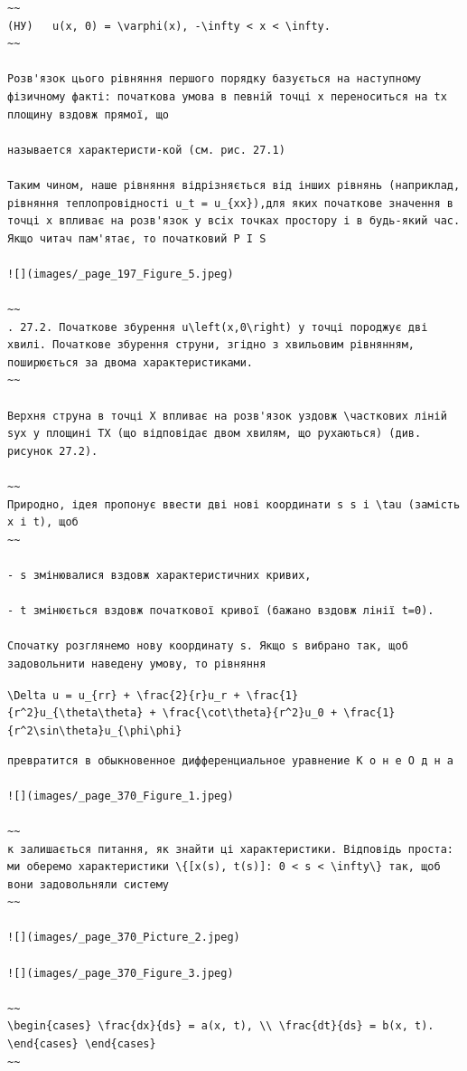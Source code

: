 \documentclass[
  ukrainian,
]{article}
\begin{document}
\begin{verbatim}
~~
(НУ)   u(x, 0) = \varphi(x), -\infty < x < \infty.
~~

Розв'язок цього рівняння першого порядку базується на наступному фізичному факті: початкова умова в певній точці x переноситься на tx площину вздовж прямої, що

называется характеристи-кой (см. рис. 27.1)

Таким чином, наше рівняння відрізняється від інших рівнянь (наприклад, рівняння теплопровідності u_t = u_{xx}),для яких початкове значення в точці x впливає на розв'язок у всіх точках простору і в будь-який час. Якщо читач пам'ятає, то початковий P I S

![](images/_page_197_Figure_5.jpeg)

~~
. 27.2. Початкове збурення u\left(x,0\right) у точці породжує дві хвилі. Початкове збурення струни, згідно з хвильовим рівнянням, поширюється за двома характеристиками.
~~

Верхня струна в точці X впливає на розв'язок уздовж \часткових ліній syx у площині TX (що відповідає двом хвилям, що рухаються) (див. рисунок 27.2).

~~
Природно, ідея пропонує ввести дві нові координати s s і \tau (замість x і t), щоб
~~

- s змінювалися вздовж характеристичних кривих,

- t змінюється вздовж початкової кривої (бажано вздовж лінії t=0).

Спочатку розглянемо нову координату s. Якщо s вибрано так, щоб задовольнити наведену умову, то рівняння
\end{verbatim}

\texttt{\textbackslash{}Delta\ u\ =\ u\_\{rr\}\ +\ \textbackslash{}frac\{2\}\{r\}u\_r\ +\ \textbackslash{}frac\{1\}\{r\^{}2\}u\_\{\textbackslash{}theta\textbackslash{}theta\}\ +\ \textbackslash{}frac\{\textbackslash{}cot\textbackslash{}theta\}\{r\^{}2\}u\_0\ +\ \textbackslash{}frac\{1\}\{r\^{}2\textbackslash{}sin\textbackslash{}theta\}u\_\{\textbackslash{}phi\textbackslash{}phi\}}

\begin{verbatim}
превратится в обыкновенное дифференциальное уравнение К о н е О д н а

![](images/_page_370_Figure_1.jpeg)

~~
к залишається питання, як знайти ці характеристики. Відповідь проста: ми оберемо характеристики \{[x(s), t(s)]: 0 < s < \infty\} так, щоб вони задовольняли систему
~~

![](images/_page_370_Picture_2.jpeg)

![](images/_page_370_Figure_3.jpeg)

~~
\begin{cases} \frac{dx}{ds} = a(x, t), \\ \frac{dt}{ds} = b(x, t). \end{cases} \end{cases}
~~
\end{verbatim}
\end{document}
